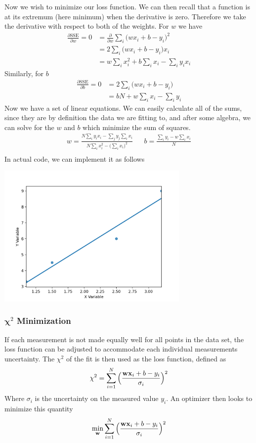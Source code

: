 Now we wish to minimize our loss function. We can then recall that a function is at its extremum (here minimum) when the derivative is zero. Therefore we take the derivative with respect to both of the weights. For $w$ we have
\begin{align}
\frac{\partial \textrm{SSE}}{\partial w} = 0 &= \frac{\partial}{\partial w} \sum_i \Big(wx_i + b - y_i \Big)^2 \\
&= 2\sum_i \Big(wx_i + b - y_i\Big)x_i\\
&= w\sum_ix_i^2 + b\sum_i x_i -\sum_i y_i x_i 
\end{align}
Similarly, for $b$
\begin{align}
\frac{\partial \textrm{SSE}}{\partial b} = 0 &= 2\sum_i \Big(wx_i + b - y_i\Big)\\
&= bN + w \sum_i x_i - \sum_i y_i 
\end{align}
Now we have a set of linear equations. We can easily calculate all of the sums, since they are by definition the data we are fitting to, and after some algebra, we can solve for the $w$ and $b$ which minimize the sum of squares.
\begin{align}
w = \frac{N\sum_i y_i x_i  - \sum_j y_j \sum_i x_i }{N\sum_i x_i^2 -\Big(\sum_i x_i\Big)^2}
&&b = \frac{\sum_i y_i - w \sum_i x_i}{N}\\
\end{align}
In actual code, we can implement it as follows




\centerline{\includegraphics[width=0.7\textwidth]{mathematics/fig/linearRegressionExact.png}}

\subsubsection{$\boldsymbol{\chi}^2$ Minimization}
If each measurement is not made equally well for all points in the data set, the loss function can be adjusted to accommodate each individual measurements uncertainty. The $\chi^2$ of the fit is then used as the loss function, defined as
 \begin{align}
    	\chi^2 = \sum_{i=1}^N\Big(\frac{\textbf{wx}_i +b - y_i}{\sigma_i}\Big)^2
\end{align}
Where $\sigma_i$ is the uncertainty on the measured value $y_i$. An optimizer then looks to minimize this quantity
\begin{align}
    \min_{\textbf{w}}  \sum_{i=1}^N\Big(\frac{\textbf{wx}_i +b - y_i}{\sigma_i}\Big)^2
\end{align}


